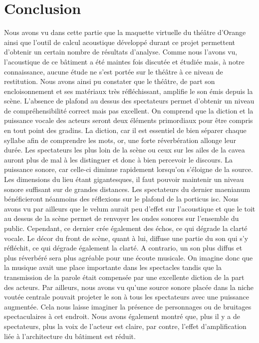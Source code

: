 \chapter*{Conclusion}
Nous avons vu dans cette partie que la maquette virtuelle du théâtre d'Orange ainsi que l'outil de calcul acoustique développé durant ce projet permettent d'obtenir un certain nombre de résultats d'analyse. Comme nous l'avons vu, l'acoustique de ce bâtiment a été maintes fois discutée et étudiée mais, à notre connaissance, aucune étude ne s'est portée sur le théâtre à ce niveau de restitution. Nous avons ainsi pu constater que le théâtre, de part son encloisonnement et ses matériaux très réfléchissant, amplifie le son émis depuis la scène. L'absence de plafond au dessus des spectateurs permet d'obtenir un niveau de compréhensibilité correct mais pas excellent. On comprend que la diction et la puissance vocale des acteurs seront deux éléments primordiaux pour être compris en tout point des gradins. La diction, car il est essentiel de bien séparer chaque syllabe afin de comprendre les mots, or, une forte réverbération allonge leur durée. Les spectateurs les plus loin de la scène ou ceux sur les ailes de la \gls{cavea} auront plus de mal à les distinguer et donc à bien percevoir le discours. La puissance sonore, car celle-ci diminue rapidement lorsqu'on s'éloigne de la source. Les dimensions du lieu étant gigantesques, il faut pouvoir maintenir un niveau sonore suffisant sur de grandes distances. Les spectateurs du dernier \gls{maenianum} bénéficieront néanmoins des réflexions sur le plafond de la \gls{porticus isc}. Nous avons vu par ailleurs que le \gls{velum} aurait peu d'effet sur l'acoustique et que le toit au dessus de la scène permet de renvoyer les ondes sonores sur l'ensemble du public. Cependant, ce dernier crée également des échos, ce qui dégrade la clarté vocale. Le décor du front de scène, quant à lui, diffuse une partie du son qui s'y réfléchit, ce qui dégrade également la clarté. A contrario, un son plus diffus et plus réverbéré sera plus agréable pour une écoute musicale. On imagine donc que la musique avait une place importante dans les spectacles tandis que la transmission de la parole était compensée par une excellente diction de la part des acteurs. Par ailleurs, nous avons vu qu'une source sonore placée dans la niche voutée centrale pouvait projeter le son à tous les spectateurs avec une puissance augmentée. Cela nous laisse imaginer la présence de personnages ou de bruitages spectaculaires à cet endroit. Nous avons également montré que, plus il y a de spectateurs, plus la voix de l'acteur est claire, par contre, l'effet d'amplification liée à l'architecture du bâtiment est réduit.



